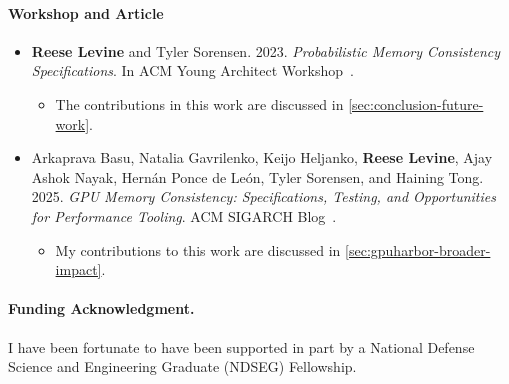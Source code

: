 \paragraph{Workshop and Article}
\begin{itemize}
  \item \textbf{Reese Levine} and Tyler Sorensen. 2023. \textit{Probabilistic Memory Consistency Specifications}. In ACM Young Architect Workshop~\cite{levine2023pmcs}.
  \begin{itemize}
    \item The contributions in this work are discussed in \mysec\ref{sec:conclusion-future-work}.
  \end{itemize}

  \item Arkaprava Basu, Natalia Gavrilenko, Keijo Heljanko, \textbf{Reese Levine}, Ajay Ashok Nayak, Hern\'an Ponce de Le\'on, Tyler Sorensen, and Haining Tong. 2025. \textit{GPU Memory Consistency: Specifications, Testing, and Opportunities for Performance Tooling}. ACM SIGARCH Blog~\cite{basu2025gpu-mcs-blog}.
  \begin{itemize}
    \item My contributions to this work are discussed in \mysec\ref{sec:gpuharbor-broader-impact}.
  \end{itemize}

\end{itemize}

\paragraph{Funding Acknowledgment.} I have been fortunate to have been supported in part by a National Defense Science and Engineering Graduate (NDSEG) Fellowship.
